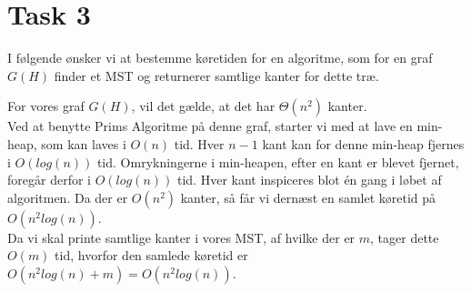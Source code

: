 \section{Task 3}
I følgende ønsker vi at bestemme køretiden for en algoritme, som for en graf $G(H)$ finder et MST og returnerer samtlige kanter for dette træ.
 
For vores graf $G(H)$, vil det gælde, at det har $\Theta(n^2)$ kanter.\\
Ved at benytte Prims Algoritme på denne graf, starter vi med at lave en min-heap, som kan laves i $O(n)$ tid. Hver $n-1$ kant kan for denne min-heap fjernes i $O(log(n))$ tid. Omrykningerne i min-heapen, efter en kant er blevet fjernet, foregår derfor i $O(log(n))$ tid.
Hver kant inspiceres blot én gang i løbet af algoritmen. Da der er $O(n^2)$ kanter, så får vi dernæst en samlet køretid på $O(n^2log(n))$.\\
Da vi skal printe samtlige kanter i vores MST, af hvilke der er $m$, tager dette$O(m)$ tid, hvorfor den samlede køretid er $O(n^2log(n) + m) = O(n^2log(n))$.
